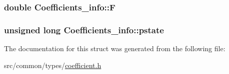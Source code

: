 \subsubsection[{\texorpdfstring{F}{F}}]{\setlength{\rightskip}{0pt plus 5cm}double Coefficients\+\_\+info\+::F}\hypertarget{structCoefficients__info_af3ccffc2c82048102f09ee41cd8ed30c}{}\label{structCoefficients__info_af3ccffc2c82048102f09ee41cd8ed30c}
\subsubsection[{\texorpdfstring{pstate}{pstate}}]{\setlength{\rightskip}{0pt plus 5cm}unsigned long Coefficients\+\_\+info\+::pstate}\hypertarget{structCoefficients__info_a8bb777249c04aa3a0e6935bd4d9949d5}{}\label{structCoefficients__info_a8bb777249c04aa3a0e6935bd4d9949d5}


The documentation for this struct was generated from the following file\+:\begin{DoxyCompactItemize}
\item 
src/common/types/\hyperlink{coefficient_8h}{coefficient.\+h}\end{DoxyCompactItemize}
